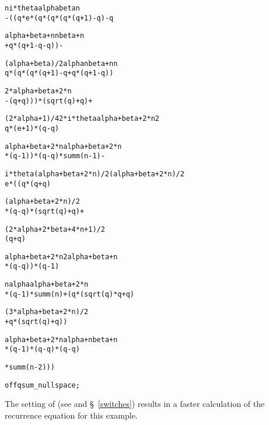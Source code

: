 {\footnotesize
\begin{alltt}
      n  i*theta   alpha   beta   n
 - ((q *e       *(q     *(q    *(q *(q + 1) - q) - q

               alpha + beta + n           n    beta + n
            + q                *(q + 1 - q  - q        )) -

         (alpha + beta)/2   alpha   n                beta + n           n
        q                *(q     *(q *(q + 1) - q + q        *(q + 1 - q ))

                2*alpha + beta + 2*n
            - (q                     + q)))*(sqrt(q) + q) +

      (2*alpha + 1)/4   2*i*theta        alpha + beta + 2*n    2
     q               *(e          + 1)*(q                   - q )

        alpha + beta + 2*n         alpha + beta + 2*n
     *(q                   - 1))*(q                   - q)*summ(n - 1) -

     i*theta    (alpha + beta + 2*n)/2   (alpha + beta + 2*n)/2
    e       *((q                      *(q                       + q)

                  (alpha + beta + 2*n)/2
               *(q                       - q)*(sqrt(q) + q) +

                 (2*alpha + 2*beta + 4*n + 1)/2
               (q                               + q)

                  alpha + beta + 2*n    2     alpha + beta + n
               *(q                   - q ))*(q                 - 1)

                 n                  alpha               alpha + beta + 2*n
              *(q  - 1)*summ(n) + (q     *(sqrt(q)*q + q                  )

                     (3*alpha + beta + 2*n)/2
                  + q                        *(sqrt(q) + q))

                 alpha + beta + 2*n        alpha + n        beta + n
              *(q                   - 1)*(q          - q)*(q         - q)

              *summ(n - 2)))

\redprompt off qsum_nullspace;
\end{alltt}}

The setting of 
(see \cite{PauleRiese:95} and \S~\ref{switches})
results in a faster
calculation of the recurrence equation for this example.


